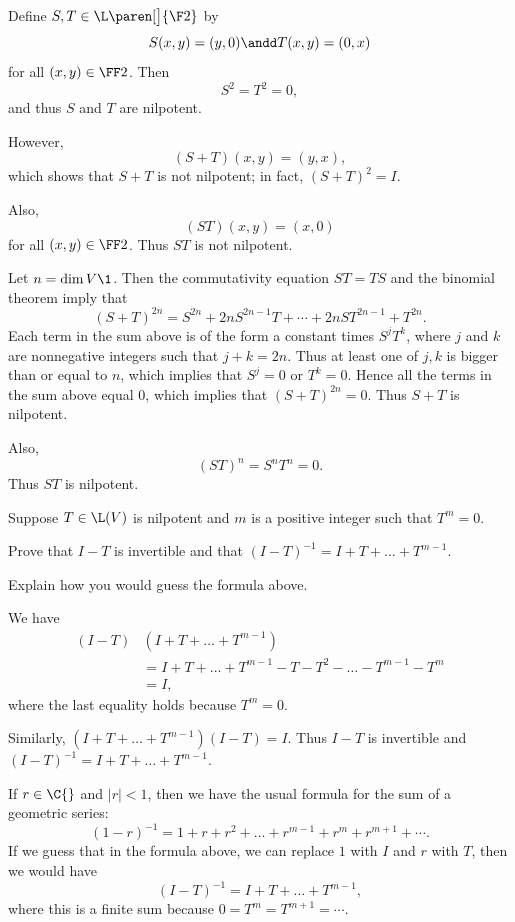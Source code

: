 \begin{Solution}
\begin{subtheorem}
\item
Define $S, T \in \L\paren[\big]{\F2}$ by
\[
S(x, y) = (y, 0) \andd T(x, y) = (0, x)
\]
for all $(x, y) \in \FF2$. Then
\[
S^2 = T^2 = 0,
\]
and thus $S$ and $T$ are nilpotent.

However,
\[
(S + T)(x, y) = (y, x),
\]
which shows that $S + T$ is not nilpotent; in fact, $(S+T)^2 = I$.

Also,
\[
(ST)(x, y) = (x, 0)
\]
for all $(x, y) \in \FF2$. Thus $ST$ is not nilpotent.

\item
Let $n = \dim V\1$. Then the commutativity equation $ST = TS$ and the binomial theorem imply that
\[
(S+T)^{2n} = S^{2n} + 2n S^{2n-1} T + \cdots + 2n S T^{2n-1} + T^{2n}.
\]
Each term in the sum above is of the form a constant times $S^j T^k\!$, where $j$ and $k$ are nonnegative integers such that $j + k = 2n$. Thus at least one of $j, k$ is bigger than or equal to $n$, which implies that $S^j = 0$ or $T^k = 0$. Hence all the terms in the sum above equal $0$, which implies that $(S+T)^{2n} = 0$. Thus $S+T$ is nilpotent.

Also,
\[
(ST)^n = S^n T^n = 0.
\]
Thus $ST$ is nilpotent.
\end{subtheorem}
\end{Solution}

\exercise
Suppose $T \in \L(V)$ is nilpotent and $m$ is a positive integer such that $T^m = 0$.
\begin{subtheorem}
\item
Prove that $I-T$ is invertible and that
$
(I - T)^{-1} = I + T + \dots + T^{m-1}$.
\item
Explain how you would guess the formula above.
\end{subtheorem}

\begin{Solution}
\begin{subtheorem}
\item
We have
\begin{align*}
(I-T)&(I + T + \dots + T^{m-1}) \\
&= I + T + \dots + T^{m-1} - T - T^2 - \dots - T^{m-1} - T^m \\
&= I,
\end{align*}
where the last equality holds because $T^m = 0$.

Similarly, $(I + T + \dots + T^{m-1})(I-T) = I$. Thus $I-T$ is invertible and
$
(I - T)^{-1} = I + T + \dots + T^{m-1}$.

\item
If $r \in \C{}$ and $|r| < 1$, then we have the usual formula for the sum of a geometric series:
\[
(1 - r)^{-1} = 1 + r + r^2 + \dots + r^{m-1} + r^m + r^{m+1} + \cdots.
\]
If we guess that in the formula above, we can replace $1$ with $I$ and $r$ with $T$, then we would have
\[
(I - T)^{-1} = I + T + \dots + T^{m-1},
\]
where this is a finite sum because $0 = T^m = T^{m+1} = \cdots$.
\end{subtheorem}
\end{Solution}

